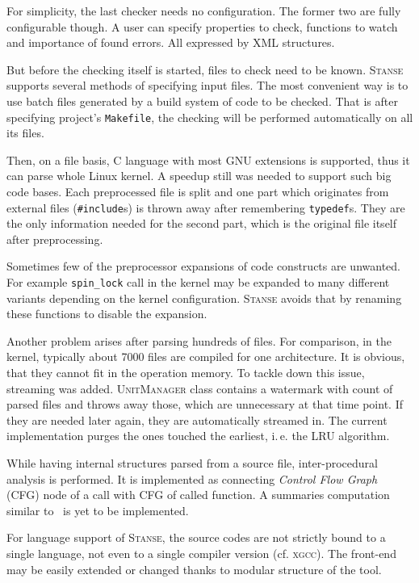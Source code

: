 \documentclass[11pt,a4paper]{article}
\newcommand{\stan}{\textsc{Stanse}\xspace}
\begin{document}
For simplicity, the last checker needs no configuration. The former two are
fully configurable though. A user can specify properties to check,
functions to watch and importance of found errors. All expressed by XML
structures.

But before the checking itself is started, files to check need to be known.
\stan supports several methods of specifying input files. The most convenient
way is to use batch files generated by a build system of code to be checked.
That is after specifying project's \texttt{Makefile}, the checking will be
performed automatically on all its files.

Then, on a file basis, C language with most GNU extensions is supported, thus
it can parse whole Linux kernel. A speedup still was needed to support such
big code bases. Each preprocessed file is split and one part which originates
from external files (\texttt{\#include}s) is thrown away after remembering
\texttt{typedef}s. They are the only information needed for the second part,
which is the original file itself after preprocessing.

Sometimes few of the preprocessor expansions of code constructs are unwanted.
For example \texttt{spin\_lock} call in the kernel may be expanded to many
different variants depending on the kernel configuration. \stan avoids that by
renaming these functions to disable the expansion.

Another problem arises after parsing hundreds of files. For comparison, in
the kernel, typically about 7000 files are compiled for one architecture. It
is obvious, that they cannot fit in the operation memory. To tackle down this
issue, streaming was added. \textsc{UnitManager} class contains a watermark
with count of parsed files and throws away those, which are unnecessary at
that time point. If they are needed later again, they are automatically
streamed in. The current implementation purges the ones touched the earliest,
i.\,e. the LRU algorithm.

While having internal structures parsed from a source file, inter-procedural
analysis is performed. It is implemented as connecting \emph{Control Flow
Graph} (CFG) node of a call with CFG of called function. A summaries
computation similar to~\cite{metal} is yet to be implemented.

For language support of \stan, the source codes are not strictly bound to a
single language, not even to a single compiler version (cf. \textsc{xgcc}).
The front-end may be easily extended or changed thanks to modular structure of
the tool.
\end{document}
